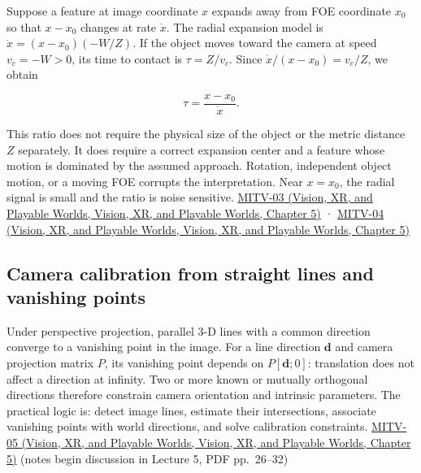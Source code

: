 Suppose a feature at image coordinate \(x\) expands away from FOE coordinate \(x_0\) so that \(x-x_0\) changes at rate \(\dot{x}\). The radial expansion model is \(\dot{x}=(x-x_0)(-W/Z)\). If the object moves toward the camera at speed \(v_c=-W>0\), its time to contact is \(\tau=Z/v_c\). Since \(\dot{x}/(x-x_0)=v_c/Z\), we obtain

\[
\tau=\frac{x-x_0}{\dot{x}}.
\]

This ratio does not require the physical size of the object or the metric distance \(Z\) separately. It does require a correct expansion center and a feature whose motion is dominated by the assumed approach. Rotation, independent object motion, or a moving FOE corrupts the interpretation. Near \(x=x_0\), the radial signal is small and the ratio is noise sensitive. \href{../07-Vision-XR-and-Playable-Worlds/main.pdf\#nameddest=04-visual-computing-ii-ch036-mitv-03---time-to-contact-focus-of-expansion-direct-motion-vision-methods-noise-gain}{MITV-03 (Vision, XR, and Playable Worlds, Vision, XR, and Playable Worlds, Chapter 5)} · \href{../07-Vision-XR-and-Playable-Worlds/main.pdf\#nameddest=04-visual-computing-ii-ch036-mitv-04---fixed-optical-flow-optical-mouse-constant-brightness-assumption-closed-form-solution}{MITV-04 (Vision, XR, and Playable Worlds, Vision, XR, and Playable Worlds, Chapter 5)}

\subsection{Camera calibration from straight lines and vanishing points}\label{03-visual-computing-i-ch003-camera-calibration-from-straight-lines-and-vanishing-points}

Under perspective projection, parallel 3-D lines with a common direction converge to a vanishing point in the image. For a line direction \(\mathbf{d}\) and camera projection matrix \(P\), its vanishing point depends on \(P[\mathbf{d};0]\): translation does not affect a direction at infinity. Two or more known or mutually orthogonal directions therefore constrain camera orientation and intrinsic parameters. The practical logic is: detect image lines, estimate their intersections, associate vanishing points with world directions, and solve calibration constraints. \href{../07-Vision-XR-and-Playable-Worlds/main.pdf\#nameddest=04-visual-computing-ii-ch036-mitv-05---tcc-and-for-montivision-demos-vanishing-point-use-of-vps-in-camera-calibration}{MITV-05 (Vision, XR, and Playable Worlds, Vision, XR, and Playable Worlds, Chapter 5)} (notes begin discussion in Lecture 5, PDF pp.~26--32)

